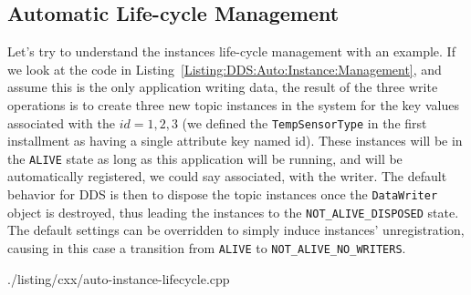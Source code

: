 \subsection{Automatic Life-cycle Management}
Let's try to understand the instances life-cycle management with an example. 
If we look at the code in Listing~\ref{Listing:DDS:Auto:Instance:Management}, 
and assume this is the only 
application writing data, the result of the three write operations is 
to create three new topic instances in the system for the key 
values associated with the $id = 1,  2,  3$ (we defined the \texttt{TempSensorType}
in the first installment as having  a single attribute key named id).  
These instances will be in the \texttt{ALIVE} state as long as this application 
will be running, and will be automatically registered, we could say 
associated, with the writer. The default behavior for DDS is then to 
dispose the topic instances once the \texttt{DataWriter} object is 
destroyed, thus leading the instances to the \texttt{NOT\_ALIVE\_DISPOSED} 
state. The default settings can be overridden to simply induce instances' 
unregistration, causing in this case a transition from \texttt{ALIVE} to 
\texttt{NOT\_ALIVE\_NO\_WRITERS}.


		{./listing/cxx/auto-instance-lifecycle.cpp}


